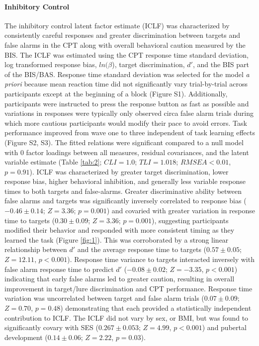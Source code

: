 \documentclass[utf8]{stylesheet}
\begin{document}
\paragraph{Inhibitory Control} 
The inhibitory control latent factor estimate (ICLF) was characterized by consistently careful responses and greater discrimination between targets and false alarms in the CPT along with overall behavioral caution measured by the BIS. The ICLF  was estimated using the CPT response time standard deviation, log transformed response bias, $ln(\beta$), target discrimination, $d'$, and the BIS part of the BIS/BAS. Response time standard deviation was selected for the model \textit{a priori} because mean reaction time did not significantly vary trial-by-trial across participants except at the beginning of a block (Figure S1). Additionally, participants were instructed to press the response button as fast as possible and variations in responses were typically only observed circa false alarm trials during which more cautious participants would modify their pace to avoid errors. Task performance improved from wave one to three independent of task learning effects (Figure S2, S3). The fitted relations were significant compared to a null model with 0 factor loadings between all measures, residual covariances, and the latent variable estimate (Table \ref{tab:2}; $CLI = 1.0$; $TLI = 1.018$; $RMSEA < 0.01$, $p = 0.91$). ICLF was characterized by greater target discrimination, lower response bias, higher behavioral inhibition, and generally less variable response times to both targets and false-alarms. Greater discriminative ability between false alarms and targets was significantly inversely correlated to response bias ($-0.46\pm0.14$; $Z=3.36$; $p=0.001$) and covaried with greater variation in response time to targets ($0.30\pm0.09$; $Z=3.36$; $p=0.001$), suggesting participants modified their behavior and responded with more consistent timing as they learned the task (Figure \ref{fig:1}). This was corroborated by a strong linear relationship between $d'$ and the average response time to targets ($0.57\pm0.05$; $Z=12.11$, $p<0.001$). Response time variance to targets interacted inversely with false alarm response time to predict $d'$ ($-0.08\pm0.02$;  $Z=-3.35$, $p < 0.001$) indicating that early false alarms led to greater caution, resulting in overall improvement in target/lure discrimination and CPT performance. Response time variation was uncorrelated between target and false alarm trials ($0.07\pm0.09$; $Z=0.70$, $p=0.48$) demonstrating that each provided a statistically independent contribution to ICLF. The ICLF did not vary by sex, or BMI, but was found to significantly covary with SES ($0.267\pm0.053$; $Z=4.99$, $p<0.001$) and pubertal development ($0.14\pm0.06$; $Z=2.22$, $p=0.03$). 
\end{document}
